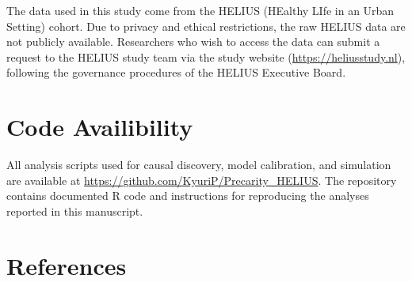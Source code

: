 \documentclass[
]{article}
\begin{document}
The data used in this study come from the HELIUS (HEalthy LIfe in an
Urban Setting) cohort. Due to privacy and ethical restrictions, the raw
HELIUS data are not publicly available. Researchers who wish to access
the data can submit a request to the HELIUS study team via the study
website (\url{https://heliusstudy.nl}), following the governance
procedures of the HELIUS Executive Board.

\section{Code Availibility}\label{code-availibility}

All analysis scripts used for causal discovery, model calibration, and
simulation are available at
\url{https://github.com/KyuriP/Precarity_HELIUS}. The repository
contains documented R code and instructions for reproducing the analyses
reported in this manuscript.

\section{References}\label{references}
\end{document}
